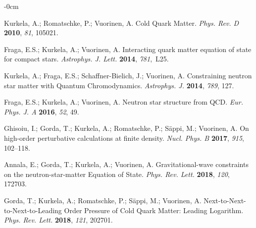 \documentclass[universe,article,accept,moreauthors,pdftex]{Definitions/mdpi}
\begin{document}
\begin{adjustwidth}{-\extralength}{0cm}
\begin{thebibliography}{999}
Kurkela, A.; Romatschke, P.; Vuorinen, A. 
Cold Quark Matter. 
\emph{Phys. Rev. D} \textbf{2010}, \emph{81}, 105021.

Fraga, E.S.; Kurkela, A.; Vuorinen, A. 
Interacting quark matter equation of state for compact stars. 
\emph{Astrophys. J. Lett.} \textbf{2014}, \emph{781},~L25.

Kurkela, A.; Fraga, E.S.; Schaffner-Bielich, J.; Vuorinen, A. 
Constraining neutron star matter with Quantum Chromodynamics. 
\emph{Astrophys. J.} \textbf{2014}, \emph{789}, 127. 

Fraga, E.S.; Kurkela, A.; Vuorinen, A. 
Neutron star structure from QCD. 
\emph{Eur. Phys. J. A} \textbf{2016}, \emph{52}, 49.

Ghisoiu, I.; Gorda, T.; Kurkela, A.; Romatschke, P.; S\"appi, M.; Vuorinen, A. 
On high-order perturbative calculations at finite density. 
\emph{Nucl. Phys. B} \textbf{2017}, \emph{915}, 102--118.

Annala, E.; Gorda, T.; Kurkela, A.; Vuorinen, A. 
Gravitational-wave constraints on the neutron-star-matter Equation of State. 
\emph{Phys. Rev. Lett.} \textbf{2018}, \emph{120}, 172703.

Gorda, T.; Kurkela, A.; Romatschke, P.; S\"appi, M.; Vuorinen, A. 
Next-to-Next-to-Next-to-Leading Order Pressure of Cold Quark Matter: Leading Logarithm. 
\emph{Phys. Rev. Lett.} \textbf{2018}, \emph{121}, 202701.


\end{thebibliography}
\end{adjustwidth}
\end{document}
